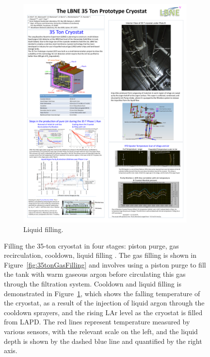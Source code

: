 \begin{figure}
\begin{subfigure}[t]{0.48\linewidth}
    \includegraphics[width=0.98\textwidth]{35tonLiquidFilling.pdf}
    \caption{Liquid filling.}
    \label{fig:35tonLiquidFilling}
  \end{subfigure}
  \caption[Filling the 35-ton cryostat in four stages: piston purge, gas recirculation, cooldown and liquid filling.]{Filling the 35-ton cryostat in four stages: piston purge, gas recirculation, cooldown, liquid filling \cite{35tonPhaseI2015}.  The gas filling is shown in Figure~\ref{fig:35tonGasFilling} and involves using a piston purge to fill the tank with warm gaseous argon before circulating this gas through the filtration system.  Cooldown and liquid filling is demonstrated in Figure~\ref{fig:35tonLiquidFilling}, which shows the falling temperature of the cryostat, as a result of the injection of liquid argon through the cooldown sprayers, and the rising LAr level as the cryostat is filled from LAPD.  The red lines represent temperature measured by various sensors, with the relevant scale on the left, and the liquid depth is shown by the dashed blue line and quantified by the right axis.}
  \label{fig:35tonFilling}
\end{figure}

